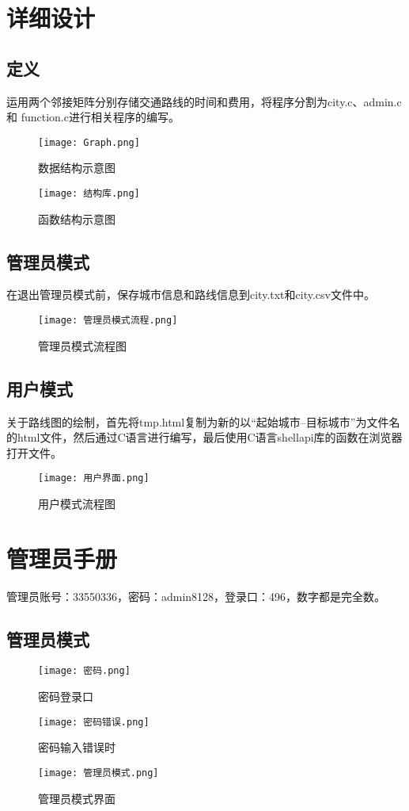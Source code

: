 \documentclass{DateStructure}
\begin{document}
\section{详细设计}	
\subsection{定义}
运用两个邻接矩阵分别存储交通路线的时间和费用，将程序分割为city.c、admin.c和 function.c进行相关程序的编写。
\begin{figure}[H] 
\centering
\texttt{[image: Graph.png]}
\caption{数据结构示意图}
\end{figure}
\begin{figure}[H] 
\centering
\texttt{[image: 结构库.png]}
\caption{函数结构示意图}
\end{figure}
\subsection{管理员模式}
在退出管理员模式前，保存城市信息和路线信息到city.txt和city.csv文件中。
\begin{figure}[H] 
\centering
\texttt{[image: 管理员模式流程.png]}
\caption{管理员模式流程图}
\end{figure}
\subsection{用户模式}
关于路线图的绘制，首先将tmp.html复制为新的以“起始城市--目标城市”为文件名的html文件，然后通过C语言进行编写，最后使用C语言shellapi库的函数在浏览器打开文件。
\begin{figure}[H] 
\centering
\texttt{[image: 用户界面.png]}
\caption{用户模式流程图}
\end{figure}
\newpage


\section{管理员手册}
管理员账号：33550336，密码：admin8128，登录口：496，数字都是完全数。
\subsection{管理员模式}
\begin{figure}[H] 
\centering
\texttt{[image: 密码.png]}
\caption{密码登录口}
\end{figure}
\begin{figure}[H] 
\centering
\texttt{[image: 密码错误.png]}
\caption{密码输入错误时}
\end{figure}
\begin{figure}[H] 
\centering
\texttt{[image: 管理员模式.png]}
\caption{管理员模式界面}
\end{figure}
\end{document}
